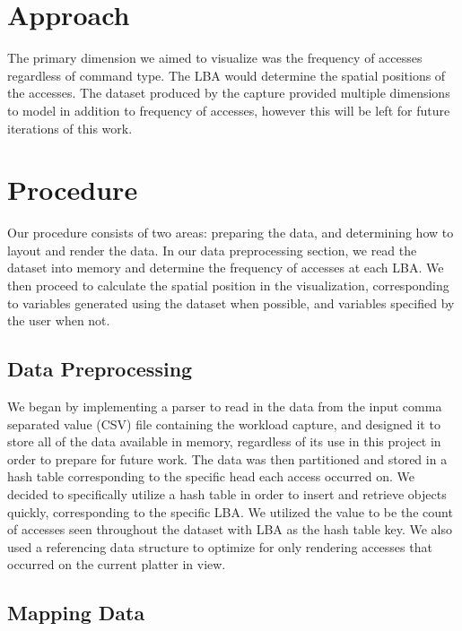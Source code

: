 \documentclass[12pt]{ucthesis}
\begin{document}
\section{Approach}
\label{approach}

The primary dimension we aimed to visualize was the frequency of accesses regardless of command type. The LBA would determine the spatial positions of the accesses. The dataset produced by the capture provided multiple dimensions to model in addition to frequency of accesses, however this will be left for future iterations of this work.

\section{Procedure}
\label{procedure}

Our procedure consists of two areas: preparing the data, and determining how to layout and render the data. In our data preprocessing section, we read the dataset into memory and determine the frequency of accesses at each LBA. We then proceed to calculate the spatial position in the visualization, corresponding to variables generated using the dataset when possible, and variables specified by the user when not.

\subsection{Data Preprocessing}
\label{preprocessing}
We began by implementing a parser to read in the data from the input comma separated value (CSV) file containing the workload capture, and designed it to store all of the data available in memory, regardless of its use in this project in order to prepare for future work. The data was then partitioned and stored in a hash table corresponding to the specific head each access occurred on. We decided to specifically utilize a hash table in order to insert and retrieve objects quickly, corresponding to the specific LBA. We utilized the value to be the count of accesses seen throughout the dataset with LBA as the hash table key. We also used a referencing data structure to optimize for only rendering accesses that occurred on the current platter in view.

\subsection{Mapping Data}
\label{mapping-data}
\end{document}
